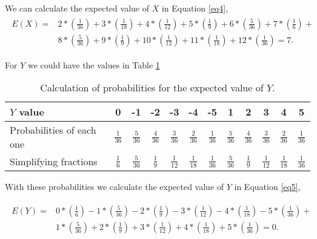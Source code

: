 \documentclass{article}
\begin{document}
We can calculate the expected value of $X$ in Equation \ref{eq4},\\

 \begin{eqnarray}
\label{eq4}
\begin{split}
E(X) = &2* \left(\frac{1}{36}\right) + 3* \left(\frac{1}{18}\right)+4* \left(\frac{1}{12}\right)+5* \left(\frac{1}{9}\right)+6* \left(\frac{5}{36}\right)+7* \left(\frac{1}{6}\right)+\\
&8* \left(\frac{5}{36}\right)+9* \left(\frac{1}{9}\right)+10* \left(\frac{1}{12}\right)+11* \left(\frac{1}{18}\right)+12* \left(\frac{1}{36}\right) = 7.
\end{split}
\end{eqnarray}

For $Y$ we could have the values in Table \ref{tab2}\\

 \begin{table}[]\caption{Calculation of probabilities for the expected value of $Y$.}\label{tab2}
\centering
\begin{tabular}{| p{2cm} | c | c | c | c | c | c | c | c | c | c | c |}
\hline
$Y$ value & 0 & -1 & -2 & -3 & -4 & -5 & 1 & 2 & 3 & 4 & 5 \\
\hline 
Probabilities of each one & $\frac{1}{36}$& $\frac{5}{36}$& $\frac{4}{36}$& $\frac{3}{36}$& $\frac{2}{36}$& $\frac{1}{36}$& $\frac{5}{36}$& $\frac{4}{36}$& $\frac{3}{36}$& $\frac{2}{36}$& $\frac{1}{36}$\\
\hline 
Simplifying fractions& $\frac{1}{6}$& $\frac{5}{36}$& $\frac{1}{9}$& $\frac{1}{12}$& $\frac{1}{18}$& $\frac{1}{36}$& $\frac{5}{36}$& $\frac{1}{9}$& $\frac{1}{12}$& $\frac{1}{18}$& $\frac{1}{36}$\\
\hline
\end{tabular}
\end{table}

With these probabilities we calculate the expected value of $Y$ in Equation \ref{eq5},

 \begin{eqnarray}
\label{eq5}
\begin{split}
E(Y) = &0* \left(\frac{1}{6}\right) - 1* \left(\frac{5}{36}\right)-2* \left(\frac{1}{9}\right)-3* \left(\frac{1}{12}\right)-4* \left(\frac{1}{18}\right)-5* \left(\frac{1}{36}\right)+\\
&1* \left(\frac{5}{36}\right)+2* \left(\frac{1}{9}\right)+3* \left(\frac{1}{12}\right)+4* \left(\frac{1}{18}\right)+5* \left(\frac{1}{36}\right) = 0.
\end{split}
\end{eqnarray}
\end{document}
